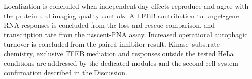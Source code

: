 Localization is concluded when independent-day effects reproduce and agree with the protein and imaging quality controls. A TFEB contribution to target-gene RNA responses is concluded from the loss-and-rescue comparison, and transcription rate from the nascent-RNA assay. Increased operational autophagic turnover is concluded from the paired-inhibitor result. Kinase--substrate chemistry, exclusive TFEB mediation and responses outside the tested HeLa conditions are addressed by the dedicated modules and the second-cell-system confirmation described in the Discussion.
